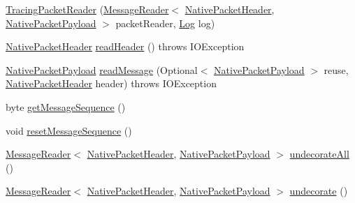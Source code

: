 \begin{DoxyCompactItemize}
\item 
\mbox{\hyperlink{classcom_1_1mysql_1_1cj_1_1protocol_1_1a_1_1_tracing_packet_reader_a5a10a043137ff4dd4c39577d98013861}{Tracing\+Packet\+Reader}} (\mbox{\hyperlink{interfacecom_1_1mysql_1_1cj_1_1protocol_1_1_message_reader}{Message\+Reader}}$<$ \mbox{\hyperlink{classcom_1_1mysql_1_1cj_1_1protocol_1_1a_1_1_native_packet_header}{Native\+Packet\+Header}}, \mbox{\hyperlink{classcom_1_1mysql_1_1cj_1_1protocol_1_1a_1_1_native_packet_payload}{Native\+Packet\+Payload}} $>$ packet\+Reader, \mbox{\hyperlink{interfacecom_1_1mysql_1_1cj_1_1log_1_1_log}{Log}} log)
\item 
\mbox{\hyperlink{classcom_1_1mysql_1_1cj_1_1protocol_1_1a_1_1_native_packet_header}{Native\+Packet\+Header}} \mbox{\hyperlink{classcom_1_1mysql_1_1cj_1_1protocol_1_1a_1_1_tracing_packet_reader_a67550eb953a1d19c2ea8663e2336e2a3}{read\+Header}} ()  throws I\+O\+Exception 
\item 
\mbox{\hyperlink{classcom_1_1mysql_1_1cj_1_1protocol_1_1a_1_1_native_packet_payload}{Native\+Packet\+Payload}} \mbox{\hyperlink{classcom_1_1mysql_1_1cj_1_1protocol_1_1a_1_1_tracing_packet_reader_aff5267e4134fe6e81a0122eb5e2d2455}{read\+Message}} (Optional$<$ \mbox{\hyperlink{classcom_1_1mysql_1_1cj_1_1protocol_1_1a_1_1_native_packet_payload}{Native\+Packet\+Payload}} $>$ reuse, \mbox{\hyperlink{classcom_1_1mysql_1_1cj_1_1protocol_1_1a_1_1_native_packet_header}{Native\+Packet\+Header}} header)  throws I\+O\+Exception 
\item 
byte \mbox{\hyperlink{classcom_1_1mysql_1_1cj_1_1protocol_1_1a_1_1_tracing_packet_reader_a35edadc0834493cc9536aa1c624c13ac}{get\+Message\+Sequence}} ()
\item 
void \mbox{\hyperlink{classcom_1_1mysql_1_1cj_1_1protocol_1_1a_1_1_tracing_packet_reader_a750a22688863ef18d02baaccd7f8475d}{reset\+Message\+Sequence}} ()
\item 
\mbox{\hyperlink{interfacecom_1_1mysql_1_1cj_1_1protocol_1_1_message_reader}{Message\+Reader}}$<$ \mbox{\hyperlink{classcom_1_1mysql_1_1cj_1_1protocol_1_1a_1_1_native_packet_header}{Native\+Packet\+Header}}, \mbox{\hyperlink{classcom_1_1mysql_1_1cj_1_1protocol_1_1a_1_1_native_packet_payload}{Native\+Packet\+Payload}} $>$ \mbox{\hyperlink{classcom_1_1mysql_1_1cj_1_1protocol_1_1a_1_1_tracing_packet_reader_a92981daf5c4331ba841e31d90d6b43ed}{undecorate\+All}} ()
\item 
\mbox{\hyperlink{interfacecom_1_1mysql_1_1cj_1_1protocol_1_1_message_reader}{Message\+Reader}}$<$ \mbox{\hyperlink{classcom_1_1mysql_1_1cj_1_1protocol_1_1a_1_1_native_packet_header}{Native\+Packet\+Header}}, \mbox{\hyperlink{classcom_1_1mysql_1_1cj_1_1protocol_1_1a_1_1_native_packet_payload}{Native\+Packet\+Payload}} $>$ \mbox{\hyperlink{classcom_1_1mysql_1_1cj_1_1protocol_1_1a_1_1_tracing_packet_reader_a5fab05e4e4ab55adf0f0755d7ca6513d}{undecorate}} ()
\end{DoxyCompactItemize}


